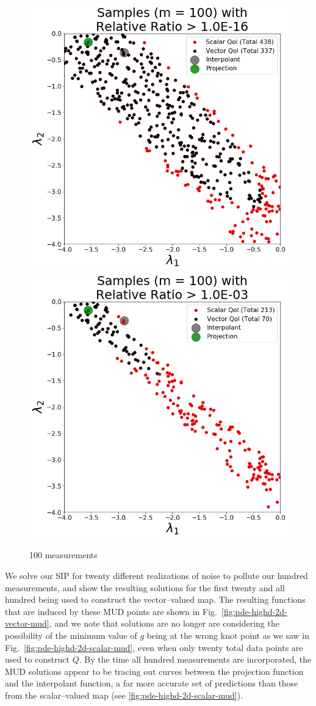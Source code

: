 \begin{figure}[htbp]
\centering
  \includegraphics[width=0.45\linewidth]{figures/pde-highd/pde-highd_update_scatter_D2_t1-0E-16.png}
  \includegraphics[width=0.45\linewidth]{figures/pde-highd/pde-highd_update_scatter_D2_t1-0E-03.png}
\caption{
100 measurements
}
\label{fig:pde-highd-2d-scatter}
\end{figure}



We solve our SIP for twenty different realizations of noise to pollute our hundred measurements, and show the resulting solutions for the first twenty and all hundred being used to construct the vector--valued map.
The resulting functions that are induced by these MUD points are shown in Fig.~\ref{fig:pde-highd-2d-vector-mud}, and we note that solutions are no longer are considering the possibility of the minimum value of $g$ being at the wrong knot point as we saw in Fig.~\ref{fig:pde-highd-2d-scalar-mud}, even when only twenty total data points are used to construct $Q$.
By the time all hundred measurements are incorporated, the MUD solutions appear to be tracing out curves between the projection function and the interpolant function, a far more accurate set of predictions than those from the scalar--valued map (see \ref{fig:pde-highd-2d-scalar-mud}).

